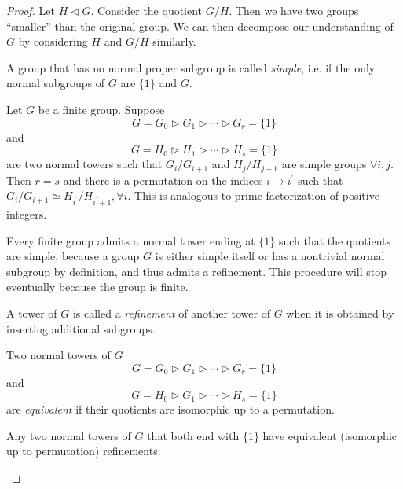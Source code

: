\begin{proof}
Let $H \triangleleft G$. Consider the quotient $G / H$. Then we have
two groups ``smaller'' than the original group. We can then decompose
our understanding of $G$ by considering $H$ and $G/H$ similarly.

\begin{defn}
A group that has no normal proper subgroup is called \emph{simple},
i.e. if the only normal subgroups of $G$ are $\{1\}$ and $G$.
\end{defn}

\begin{theorem}
Let $G$ be a finite group. Suppose
$$
G = G_0 \triangleright G_1
        \triangleright \cdots
        \triangleright G_r = \{1\}
$$
and
$$
G = H_0 \triangleright H_1
        \triangleright \cdots
        \triangleright H_s = \{1\}
$$
are two normal towers such that
$G_i / G_{i+1}$ and $H_j / H_{j+1}$ are simple groups
$\forall i, j$. Then $r = s$ and there is a permutation
on the indices $i \to i^\prime$ such that
$G_i / G_{i+1} \simeq H_{i^\prime} / H_{i^\prime + 1}, \forall
i$. This is analogous to prime factorization of positive integers.
\end{theorem}

\begin{remark}
Every finite group admits a normal tower ending at $\{ 1 \}$ such that
the quotients are simple, because a group $G$ is either simple itself
or has a nontrivial normal subgroup by definition, and thus admits a
refinement. This procedure will stop eventually because the group is finite.
\end{remark}

\begin{defn}[Refinement]
A tower of $G$ is called a \emph{refinement} of another tower of $G$
when it is obtained by inserting additional subgroups.
\end{defn}

\begin{defn}
Two normal towers of $G$
$$
G = G_0 \triangleright G_1
        \triangleright \cdots
        \triangleright G_r = \{1\}
$$
and
$$
G = H_0 \triangleright G_1
        \triangleright \cdots
        \triangleright H_s = \{1\}
$$
are \emph{equivalent} if their quotients are isomorphic up to a permutation.
\end{defn}

\begin{theorem}[Schreier]
Any two normal towers of $G$ that both end with $\{1\}$ have
equivalent (isomorphic up to permutation) refinements.
\end{theorem}


\end{proof}
